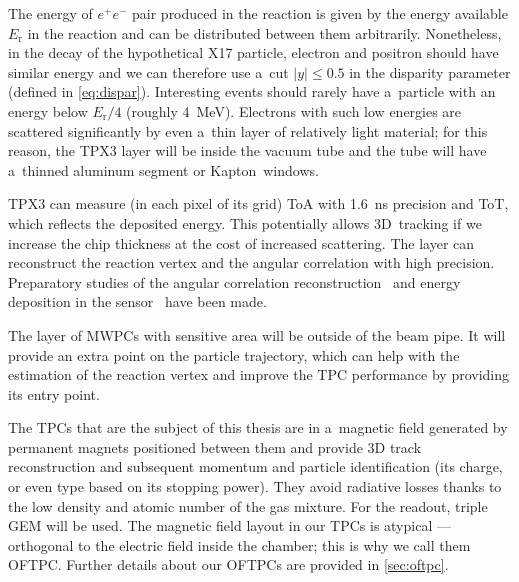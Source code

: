 		The energy of $e^+e^-$ pair produced in the reaction is given by the energy available $E_\text{r}$ in the reaction and can be distributed between them arbitrarily. Nonetheless, in the decay of the hypothetical X17 particle, electron and positron should have similar energy and we can therefore use a~cut $|y| \leq 0.5$ in the disparity parameter (defined in \cref{eq:dispar}). Interesting events should rarely have a~particle with an energy below $E_\text{r}/4$ (roughly \qty{4}{\MeV}). Electrons with such low energies are scattered significantly by even a~thin layer of relatively light material; for this reason, the \ac{TPX3} layer will be inside the vacuum tube and the tube will have a~thinned aluminum segment or Kapton\texttrademark\ windows.
		
		\ac{TPX3} can measure (in each  pixel of its  grid) \ac{ToA} with \qty{1.6}{\ns} precision and \ac{ToT}, which reflects the deposited energy. This potentially allows 3D~tracking if we increase the chip thickness at the cost of increased scattering. The layer can reconstruct the reaction vertex and the angular correlation with high precision. Preparatory studies of the angular correlation reconstruction~\cite{triangle} and energy deposition in the sensor~\cite{tpx3_tracks} have been made.
		
		The layer of \acp{MWPC} with sensitive area  will be outside of the beam pipe. It will provide an extra point on the particle trajectory, which can help with the estimation of the reaction vertex and improve the \ac{TPC} performance by providing its entry point.
		
		The \acp{TPC} that are the subject of this thesis are in a~magnetic field generated by permanent magnets positioned between them and provide 3D track reconstruction and subsequent momentum and particle identification (its charge, or even type based on its stopping power). They avoid radiative losses thanks to the low density and atomic number of the gas mixture. For the readout, triple \ac{GEM} will be used. The magnetic field layout in our \acp{TPC} is atypical --- orthogonal to the electric field inside the chamber; this is why we call them \acf{OFTPC}. Further details about our \acp{OFTPC} are provided in \cref{sec:oftpc}.